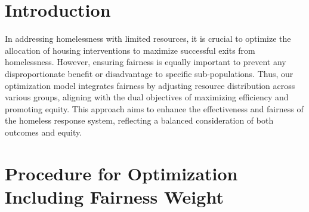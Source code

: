 \documentclass{article}
\begin{document}
\section*{Introduction}
In addressing homelessness with limited resources, it is crucial to optimize the allocation of housing interventions to maximize successful exits from homelessness. However, ensuring fairness is equally important to prevent any disproportionate benefit or disadvantage to specific sub-populations. Thus, our optimization model integrates fairness by adjusting resource distribution across various groups, aligning with the dual objectives of maximizing efficiency and promoting equity. 
This approach aims to enhance the effectiveness and fairness of the homeless response system, reflecting a balanced consideration of both outcomes and equity.
\section*{Procedure for Optimization Including Fairness Weight}
\end{document}
